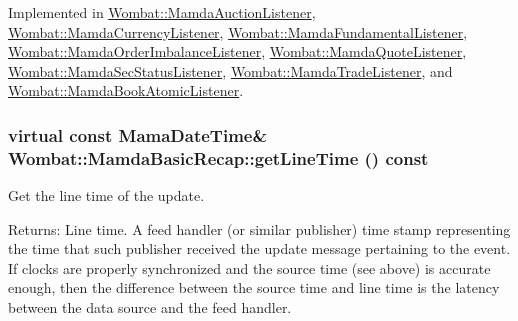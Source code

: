 Implemented in \hyperlink{classWombat_1_1MamdaAuctionListener_f45aaa5aebbae7e326da900ea11c8422}{Wombat::Mamda\-Auction\-Listener}, \hyperlink{classWombat_1_1MamdaCurrencyListener_7ad1cdb959dcb619780b27383704d157}{Wombat::Mamda\-Currency\-Listener}, \hyperlink{classWombat_1_1MamdaFundamentalListener_d6594a4cff5a7bf08b8f4fcc171d68d9}{Wombat::Mamda\-Fundamental\-Listener}, \hyperlink{classWombat_1_1MamdaOrderImbalanceListener_e01441cb3be1b7466ece277699971fa3}{Wombat::Mamda\-Order\-Imbalance\-Listener}, \hyperlink{classWombat_1_1MamdaQuoteListener_79f601394c430d4883bcb41f0b470b29}{Wombat::Mamda\-Quote\-Listener}, \hyperlink{classWombat_1_1MamdaSecStatusListener_5c7ee86111027d782bc1477700a78224}{Wombat::Mamda\-Sec\-Status\-Listener}, \hyperlink{classWombat_1_1MamdaTradeListener_a43ecdb29f836cb0176ca473515de915}{Wombat::Mamda\-Trade\-Listener}, and \hyperlink{classWombat_1_1MamdaBookAtomicListener_9910ae16b92a548bce1821ed98de8956}{Wombat::Mamda\-Book\-Atomic\-Listener}.\hypertarget{classWombat_1_1MamdaBasicRecap_acebac8f3a0d9a82eef145aca53a6d77}{
\subsubsection[getLineTime]{\setlength{\rightskip}{0pt plus 5cm}virtual const Mama\-Date\-Time\& Wombat::Mamda\-Basic\-Recap::get\-Line\-Time () const}}
\label{classWombat_1_1MamdaBasicRecap_acebac8f3a0d9a82eef145aca53a6d77}


Get the line time of the update. 

\begin{Desc}
\item[Returns:]Line time. A feed handler (or similar publisher) time stamp representing the time that such publisher received the update message pertaining to the event. If clocks are properly synchronized and the source time (see above) is accurate enough, then the difference between the source time and line time is the latency between the data source and the feed handler. \end{Desc}


